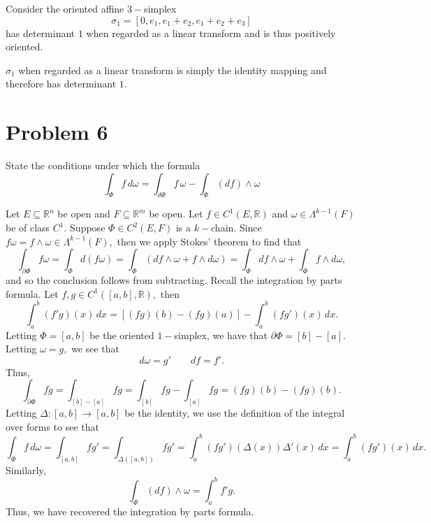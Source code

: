 \documentclass[11pt]{article}
\newcommand{\bbR}{\mathbb{R}}
\begin{document}
\newpage
\begin{problem}
    Consider the oriented affine $3-$simplex
    \[\sigma_1 = [0, e_1, e_1 + e_2, e_1 + e_2 + e_3]\] has determinant $1$ when regarded as a linear transform and is thus positively oriented.
\end{problem}
\begin{solution}
    $\sigma_1$ when regarded as a linear transform is simply the identity mapping and therefore has determinant $1.$ 
\end{solution}

\newpage
\section*{Problem 6}
\begin{problem}
    State the conditions under which the formula 
    \[\int_\Phi f\,d\omega = \int_{d\Phi}f \,\omega - \int_{\Phi}(df)\wedge \omega\]
\end{problem}
\begin{solution}
Let $E \subseteq \bbR^n$ be open and $F\subseteq \bbR^m$ be open. Let $f\in C^1(E, \bbR)$ and $\omega \in \Lambda^{k-1}(F)$ be of class $C^1.$ Suppose $\Phi\in C^2(E,F)$ is a $k-$chain. Since $f\omega = f\wedge \omega \in \Lambda^{k-1}(F),$ then we apply Stokes' theorem to find that 
\[\int_{\partial\Phi} f\omega = \int_{\Phi} d(f\omega) = \int_{\Phi} (df \wedge \omega + f \wedge d\omega) = \int_\Phi df\wedge \omega + \int_{\Phi} f\wedge d\omega,\] and so the conclusion follows from subtracting. Recall the integration by parts formula. Let $f,g \in C^1([a,b], \bbR),$ then 
\[\int_a^b (f'g)(x) \,dx= [(fg)(b) - (fg)(a)] - \int_a^b (fg')(x)\,dx.\] Letting $\Phi = [a,b]$ be the oriented $1-$simplex, we have that $\partial \Phi = [b] - [a].$ Letting $\omega = g,$ we see that 
\[d\omega = g'\qquad df = f'.\] Thus, 
\[\int_{\partial \Phi} fg = \int_{[b] - [a]}fg = \int_{[b]}fg - \int_{[a]}fg = (fg)(b) - (fg)(b).\] Letting $\Delta:[a,b]\to [a,b]$ be the identity, we use the definition of the integral over forms to see that 
\[\int_{\Phi}f\,d\omega = \int_{[a,b]}fg' = \int_{\Delta([a,b])}fg' = \int_a^b (fg')(\Delta(x))\Delta'(x)\,dx = \int_a^b (fg')(x)\,dx.\] Similarly, 
\[\int_{\Phi}(df)\wedge \omega = \int_a^b f'g.\] Thus, we have recovered the integration by parts formula.
\end{solution}

\newpage
\end{document}
